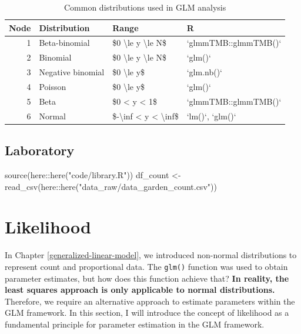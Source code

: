 \documentclass[
]{article}
\newenvironment{Shaded}{\begin{snugshade}}{\end{snugshade}}
\newcommand{\FunctionTok}[1]{\textcolor[rgb]{0.00,0.00,0.00}{#1}}
\newcommand{\NormalTok}[1]{#1}
\newcommand{\OtherTok}[1]{\textcolor[rgb]{0.56,0.35,0.01}{#1}}
\newcommand{\SpecialCharTok}[1]{\textcolor[rgb]{0.00,0.00,0.00}{#1}}
\newcommand{\StringTok}[1]{\textcolor[rgb]{0.31,0.60,0.02}{#1}}
\begin{document}
\begin{table}

\caption{\label{tab:table-dist}Common distributions used in GLM analysis}
\centering
\begin{tabular}[t]{r|l|l|l}
\hline
Node & Distribution & Range & R\\
\hline
1 & Beta-binomial & \$0 \textbackslash{}le y \textbackslash{}le N\$ & `glmmTMB::glmmTMB()`\\
\hline
2 & Binomial & \$0 \textbackslash{}le y \textbackslash{}le N\$ & `glm()`\\
\hline
3 & Negative binomial & \$0 \textbackslash{}le y\$ & `glm.nb()`\\
\hline
4 & Poisson & \$0 \textbackslash{}le y\$ & `glm()`\\
\hline
5 & Beta & \$0 < y < 1\$ & `glmmTMB::glmmTMB()`\\
\hline
6 & Normal & \$-\textbackslash{}inf < y < \textbackslash{}inf\$ & `lm()`, `glm()`\\
\hline
\end{tabular}
\end{table}

\hypertarget{laboratory-7}{%
\subsection{Laboratory}\label{laboratory-7}}

\begin{Shaded}
\begin{Highlighting}[]
\FunctionTok{source}\NormalTok{(here}\SpecialCharTok{::}\FunctionTok{here}\NormalTok{(}\StringTok{"code/library.R"}\NormalTok{))}
\NormalTok{df\_count }\OtherTok{\textless{}{-}} \FunctionTok{read\_csv}\NormalTok{(here}\SpecialCharTok{::}\FunctionTok{here}\NormalTok{(}\StringTok{"data\_raw/data\_garden\_count.csv"}\NormalTok{))}
\end{Highlighting}
\end{Shaded}

\hypertarget{likelihood}{%
\section{Likelihood}\label{likelihood}}

In Chapter \ref{generalized-linear-model}, we introduced non-normal distributions to represent count and proportional data. The \texttt{glm()} function was used to obtain parameter estimates, but how does this function achieve that? \textbf{In reality, the least squares approach is only applicable to normal distributions.} Therefore, we require an alternative approach to estimate parameters within the GLM framework. In this section, I will introduce the concept of likelihood as a fundamental principle for parameter estimation in the GLM framework.
\end{document}
